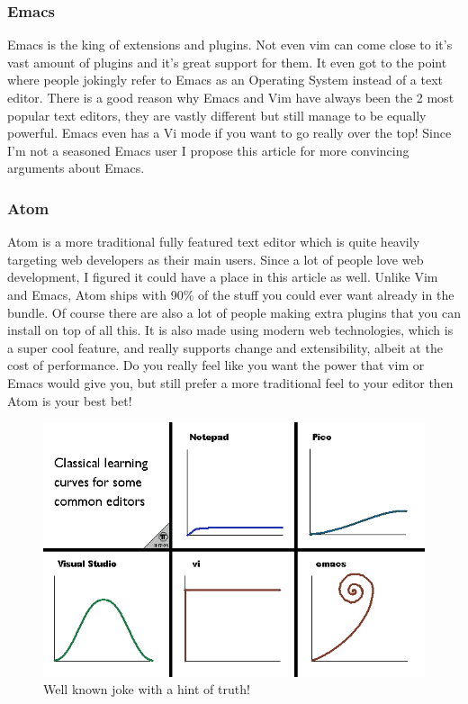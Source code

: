 \documentclass[paper=a4, fontsize=10pt]{scrartcl} %
\numberwithin{equation}{section} %
\numberwithin{figure}{section} %
\numberwithin{table}{section} %
\begin{document}
\subsubsection{Emacs\cite{emacs}}
Emacs is the king of extensions and plugins. Not even vim can come close to
it's vast amount of plugins and it's great support for them. It even got to the
point where people jokingly refer to Emacs as an Operating System instead of a
text editor. There is a good reason why Emacs and Vim have always been the 2
most popular text editors, they are vastly different but still manage to be
equally powerful. Emacs even has a Vi mode if you want to go really over the
top!
Since I'm not a seasoned Emacs user I propose this article for more convincing
arguments about Emacs.\cite{whousesemacs}
\subsubsection{Atom\cite{atom}}
Atom is a more traditional fully featured text editor which is quite heavily targeting web
developers as their main users. Since a lot of people love web development, I
figured it could have a place in this article as well. Unlike Vim and Emacs,
Atom ships with 90\% of the stuff you could ever want already in the bundle.
Of course there are also a lot of people making extra plugins that you can install on
top of all this. It is also made using
modern web technologies, which is a super cool feature, and really supports
change and extensibility, albeit at the cost of performance. Do you
really feel like you want the power that vim or Emacs would give you, but still
prefer a more traditional feel to your editor then Atom is your best bet!
\newline
\begin{figure}[h]
    \centering
    \includegraphics[scale=0.6]{editorlearningcurve.png}
    \caption{Well known joke with a hint of truth!}
\end{figure}
\end{document}

